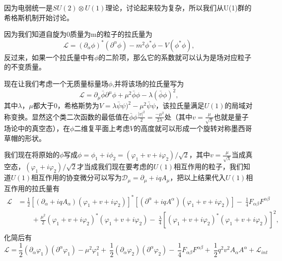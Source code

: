 因为电弱统一是$SU(2)\otimes U(1)$理论，讨论起来较为复杂，所以我们从U(1)群的希格斯机制开始讨论。

因为我们知道自旋为0质量为m的粒子的拉氏量为
\begin{equation}
    \mathscr{L}=(\partial_{\alpha} \phi)^*(\partial^{\alpha} \phi)-m^2\phi^*\phi -V(\phi^*\phi),
\end{equation}
反过来，如果一个拉氏量中有$\phi$的二阶项，那么它的系数就可以认为是场对应粒子的不变质量。

现在让我们考虑一个无质量标量场$\phi$,并将该场的拉氏量写为
\begin{equation}\label{eq:1.1}
    \mathscr{L}=\partial_{\mu}\bar{\phi}\partial^{\mu} \phi+\mu^2\bar{\phi}\phi -\lambda(\bar{\phi}\phi)^2,
\end{equation}
其中$\lambda$，$\mu$都大于0，希格斯势为$V=\lambda\bar{\psi}\psi)^2-\mu^2\bar{\psi}\psi$，该拉氏量满足$U(1)$的局域对称变换。显然这个类二次函数的最低值在$\bar{\phi}\phi\frac{|v|^2}{2}=\frac{-\mu^2}{2\lambda}$处（其中$v=\frac{\mu}{\sqrt{\lambda}}$也就是量子场论中的真空态），在$\phi$二维复平面上考虑$V$的高度就可以形成一个旋转对称墨西哥草帽的形状。

我们现在将原始的$\phi$写成$\phi=\phi_1+i\phi_2=(\varphi_1+v+i\varphi_2)/\sqrt{2}$，其中$v=\frac{\mu}{\sqrt{\lambda}}$当成真空态，$(\varphi_1+i\varphi_2)/\sqrt{2}$才当成我们现在要考虑的$U(1)$相互作用的粒子，我们知道$U(1)$相互作用的协变微分可以写为$\mathcal{D}_\mu=\partial_{\mu}+iqA_{\mu}$，把以上结果代入$U(1)$相互作用的拉氏量有
\begin{equation}
\begin{aligned}\mathscr{L} & =\frac{1}{2}[(\partial_{\alpha}+iqA_{\alpha})(\varphi_1+v+i\varphi_2)]^*
[(\partial^{\alpha}+iqA^{\alpha})(\varphi_1+v+i\varphi_2)]
-\ \frac{1}{4}F_{\alpha\beta}F^{\alpha\beta} \\
 & \qquad+\frac{\mu^2}{2}(\varphi_1+v+i\varphi_2)^*(\varphi_1+v+i\varphi_2)
-\ \frac{\lambda}{4}[(\varphi_1+v+i\varphi_2)^*(\varphi_1+v+i\varphi_2)]^2 ,\\
\end{aligned}
\end{equation}
化简后有
\begin{equation}
    \mathscr{L}=\frac{1}{2}(\partial_{\alpha}\varphi_1)(\partial^{\alpha}\varphi_1)
-\mu^2\varphi_1^2+\ \frac{1}{2}(\partial_{\alpha}\varphi_2)(\partial^{\alpha}\varphi_2)-\ \frac{1}{4}F_{\alpha\beta}F^{\alpha\beta} +\ \frac{1}{2}q^2 v^2 A_{\alpha}A^{\alpha}+ \mathscr{L}_{int}
\end{equation}

